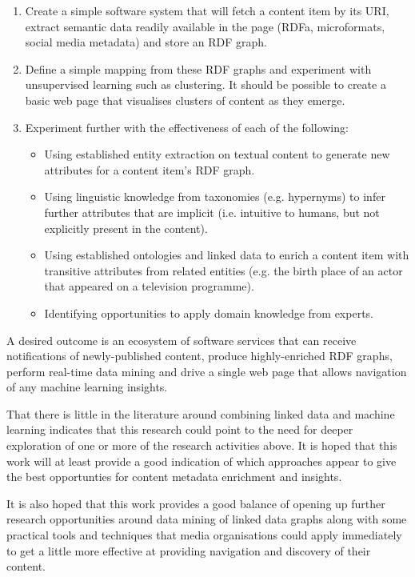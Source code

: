 \documentclass[10pt,a4paper]{article}
\begin{document}
\begin{enumerate}

\item Create a simple software system that will fetch a content item by its
URI, extract semantic data readily available in the page (RDFa, microformats,
social media metadata) and store an RDF graph.

\item Define a simple mapping from these RDF graphs and experiment with
unsupervised learning such as clustering. It should be possible to create a
basic web page that visualises clusters of content as they emerge.

\item Experiment further with the effectiveness of each of the following:
\begin{itemize}
\item Using established entity extraction on textual content to generate new
attributes for a content item's RDF graph.
\item Using linguistic knowledge from taxonomies (e.g. hypernyms) to infer
further attributes that are implicit (i.e. intuitive to humans, but not
explicitly present in the content).
\item Using established ontologies and linked data to enrich a content item
with transitive attributes from related entities (e.g. the birth place of an
actor that appeared on a television programme).
\item Identifying opportunities to apply domain knowledge from experts.
\end {itemize}

\end{enumerate}

A desired outcome is an ecosystem of software services that can receive
notifications of newly-published content, produce highly-enriched RDF graphs,
perform real-time data mining and drive a single web page that allows navigation
of any machine learning insights.

That there is little in the literature around combining linked data and machine
learning indicates that this research could point to the need for deeper
exploration of one or more of the research activities above. It is hoped that
this work will at least provide a good indication of which approaches appear to
give the best opportunties for content metadata enrichment and insights.

It is also hoped that this work provides a good balance of opening up further
research opportunities around data mining of linked data graphs along with some
practical tools and techniques that media organisations could apply immediately
to get a little more effective at providing navigation and discovery of their
content.
\end{document}
